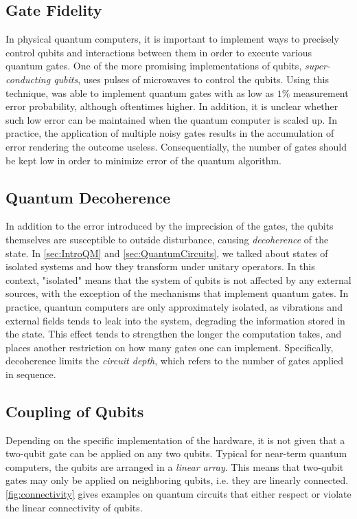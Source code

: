 \subsection{Gate Fidelity}\label{sec:GateFidelity}
In physical quantum computers, it is important to implement ways to precisely control qubits and interactions between them in order to execute various quantum gates. One of the more promising implementations of qubits, \emph{super-conducting qubits}, uses pulses of microwaves to control the qubits. Using this technique, \citet{Barends_2014} was able to implement quantum gates with as low as $1\%$ measurement error probability, although oftentimes higher. In addition, it is unclear whether such low error can be maintained when the quantum computer is scaled up. In practice, the application of multiple noisy gates results in the accumulation of error rendering the outcome useless\cite{Preskill_2018}. Consequentially, the number of gates should be kept low in order to minimize error of the quantum algorithm. 

\subsection{Quantum Decoherence}\label{sec:DaEC}
In addition to the error introduced by the imprecision of the gates, the qubits themselves are susceptible to outside disturbance, causing \emph{decoherence} of the state. In \autoref{sec:IntroQM} and \autoref{sec:QuantumCircuits}, we talked about states of isolated systems and how they transform under unitary operators. In this context, "isolated" means that the system of qubits is not affected by any external sources, with the exception of the mechanisms that implement quantum gates. In practice, quantum computers are only approximately isolated, as vibrations and external fields tends to leak into the system, degrading the information stored in the state. This effect tends to strengthen the longer the computation takes, and places another restriction on how many gates one can implement. Specifically, decoherence limits the \emph{circuit depth}, which refers to the number of gates applied in sequence. 

\subsection{Coupling of Qubits}\label{sec:CoQ}
Depending on the specific implementation of the hardware, it is not given that a two-qubit gate can be applied on any two qubits. Typical for near-term quantum computers, the qubits are arranged in a \emph{linear array}\cite{Holmes_2020}. This means that two-qubit gates may only be applied on neighboring qubits, i.e. they are linearly connected. \autoref{fig:connectivity} gives examples on quantum circuits that either respect or violate the linear connectivity of qubits.     

